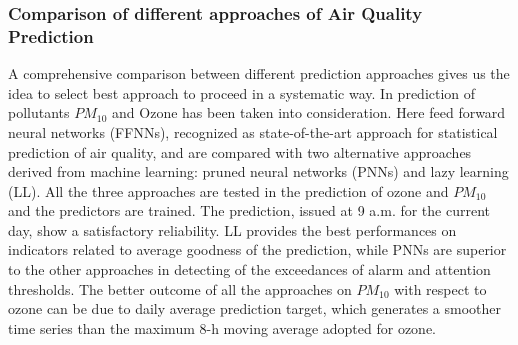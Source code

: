 \subsubsection{Comparison of different approaches of Air Quality Prediction \cite{24}}
A comprehensive comparison between different prediction approaches gives us the idea to select best approach to proceed in a systematic way. In prediction of pollutants $PM_{10}$ and Ozone has been taken into consideration. Here feed forward neural networks (FFNNs), recognized as state-of-the-art approach for statistical prediction of air quality, and are compared with two alternative approaches derived from machine learning: pruned neural networks (PNNs) and lazy learning (LL). All the three approaches are tested in the prediction of ozone and $PM_{10}$ and the predictors are trained. The prediction, issued at 9 a.m. for the current day, show a satisfactory reliability. LL provides the best performances on indicators related to average goodness of the prediction, while PNNs are superior to the other approaches in detecting of the exceedances of alarm and attention thresholds. The better outcome of all the approaches on $PM_{10}$ with respect to ozone can be due to daily average prediction target, which generates a smoother time series than the maximum 8-h moving average adopted for ozone.

